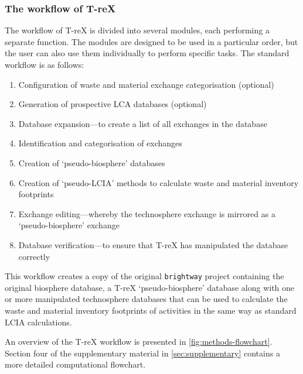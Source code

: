 \documentclass[a4paper,fleqn]{cas-dc}
\begin{document}
\subsubsection{The workflow of T-reX}

The workflow of T-reX is divided into several modules, each performing a
separate function. The modules are designed to be used in a particular order,
but the user can also use them individually to perform specific tasks. The
standard workflow is as follows:

\begin{enumerate}
	\item Configuration of waste and material exchange categorisation (optional)
	\item Generation of prospective LCA databases (optional)
	\item Database expansion---to create a list of all exchanges in the database
	\item Identification and categorisation of exchanges
	\item Creation of `pseudo-biosphere' databases
	\item Creation of `pseudo-LCIA' methods to calculate waste and material inventory
	      footprints
	\item Exchange editing---whereby the technosphere exchange is mirrored as a
	      `pseudo-biosphere' exchange
	\item Database verification---to ensure that T-reX has manipulated the database
	      correctly
\end{enumerate}

This workflow creates a copy of the original \texttt{brightway} project
containing the original biosphere database, a T-reX `pseudo-biosphere' database
along with one or more manipulated technosphere databases that can be used to
calculate the waste and material inventory footprints of activities in the same
way as standard LCIA calculations.

An overview of the T-reX workflow is presented in
\autoref{fig:methods-flowchart}. Section four of the supplementary material in
\autoref{sec:supplementary} contains a more detailed computational flowchart.
\end{document}
